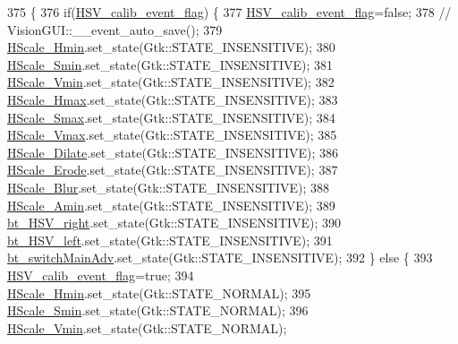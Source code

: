 \begin{DoxyCode}
375                                              \{
376     \textcolor{keywordflow}{if}(\hyperlink{class_vision_g_u_i_ac732afeda7552e0c1dc4db8d63633be2}{HSV\_calib\_event\_flag}) \{
377         \hyperlink{class_vision_g_u_i_ac732afeda7552e0c1dc4db8d63633be2}{HSV\_calib\_event\_flag}=\textcolor{keyword}{false};
378         \textcolor{comment}{// VisionGUI::\_\_event\_auto\_save();}
379         \hyperlink{class_vision_g_u_i_a8cc0de8ce9ca9c05d1c47176b724ecc3}{HScale\_Hmin}.set\_state(Gtk::STATE\_INSENSITIVE);
380         \hyperlink{class_vision_g_u_i_a23eb7af1cc6d3a055892de4704b48126}{HScale\_Smin}.set\_state(Gtk::STATE\_INSENSITIVE);
381         \hyperlink{class_vision_g_u_i_a8a1e7f6d4357eceab8e47fe0fb523cf9}{HScale\_Vmin}.set\_state(Gtk::STATE\_INSENSITIVE);
382         \hyperlink{class_vision_g_u_i_a0b1bb9b8a70bd1f93427f71d0e885313}{HScale\_Hmax}.set\_state(Gtk::STATE\_INSENSITIVE);
383         \hyperlink{class_vision_g_u_i_a147e8499bd7412fdb732103c0754f013}{HScale\_Smax}.set\_state(Gtk::STATE\_INSENSITIVE);
384         \hyperlink{class_vision_g_u_i_ab277d08dcce9e2521b9d4c542be69247}{HScale\_Vmax}.set\_state(Gtk::STATE\_INSENSITIVE);
385         \hyperlink{class_vision_g_u_i_a6a7c757a11a2699e841b6b49fe18d1de}{HScale\_Dilate}.set\_state(Gtk::STATE\_INSENSITIVE);
386         \hyperlink{class_vision_g_u_i_ad4bc77416f4e50fa03a7cc7f64a2d78e}{HScale\_Erode}.set\_state(Gtk::STATE\_INSENSITIVE);
387         \hyperlink{class_vision_g_u_i_a88fa2852521012287ae804404280c57f}{HScale\_Blur}.set\_state(Gtk::STATE\_INSENSITIVE);
388         \hyperlink{class_vision_g_u_i_a72d3a4fe84821ceafeb4293f196aacd7}{HScale\_Amin}.set\_state(Gtk::STATE\_INSENSITIVE);
389         \hyperlink{class_vision_g_u_i_a3b19593890776c5c77e1a39ac3af627d}{bt\_HSV\_right}.set\_state(Gtk::STATE\_INSENSITIVE);
390         \hyperlink{class_vision_g_u_i_a98323988d4a353190a02c827de0cecbf}{bt\_HSV\_left}.set\_state(Gtk::STATE\_INSENSITIVE);
391         \hyperlink{class_vision_g_u_i_a62b2427b20780649d71611c6cdb6a10a}{bt\_switchMainAdv}.set\_state(Gtk::STATE\_INSENSITIVE);
392     \} \textcolor{keywordflow}{else} \{
393         \hyperlink{class_vision_g_u_i_ac732afeda7552e0c1dc4db8d63633be2}{HSV\_calib\_event\_flag}=\textcolor{keyword}{true};
394         \hyperlink{class_vision_g_u_i_a8cc0de8ce9ca9c05d1c47176b724ecc3}{HScale\_Hmin}.set\_state(Gtk::STATE\_NORMAL);
395         \hyperlink{class_vision_g_u_i_a23eb7af1cc6d3a055892de4704b48126}{HScale\_Smin}.set\_state(Gtk::STATE\_NORMAL);
396         \hyperlink{class_vision_g_u_i_a8a1e7f6d4357eceab8e47fe0fb523cf9}{HScale\_Vmin}.set\_state(Gtk::STATE\_NORMAL);

\end{DoxyCode}
